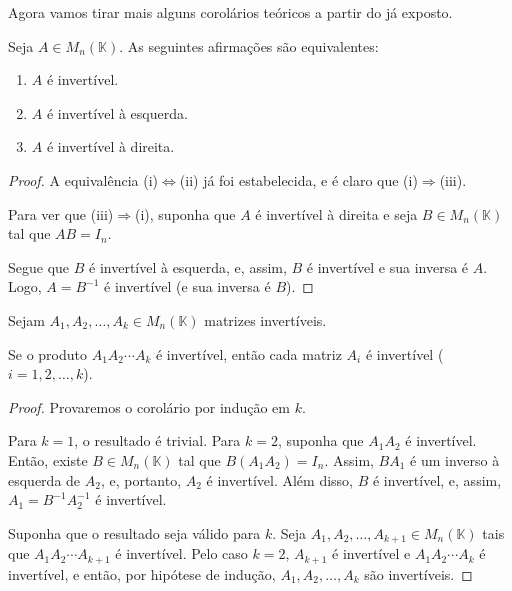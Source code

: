 Agora vamos tirar mais alguns corolários teóricos a partir do já exposto.

\begin{corollary}
    Seja $A\in M_{n}(\mathbb K)$.
    As seguintes afirmações são equivalentes:
    \begin{enumerate}[label=(\roman*)]
        \item $A$ é invertível.
        \item $A$ é invertível à esquerda.
        \item $A$ é invertível à direita.
    \end{enumerate}
\end{corollary}
\begin{proof}
    A equivalência (i)$\Leftrightarrow$(ii) já foi estabelecida, e é claro que (i)$\Rightarrow$(iii).

    Para ver que (iii)$\Rightarrow$(i), suponha que $A$ é invertível à direita e seja $B\in M_{n}(\mathbb K)$ tal que $AB=I_n$.

    Segue que $B$ é invertível à esquerda, e, assim, $B$ é invertível e sua inversa é $A$.
    Logo, $A=B^{-1}$ é invertível (e sua inversa é $B$).
\end{proof}


\begin{corollary}
    Sejam $A_1, A_2, \dots, A_k\in M_{n}(\mathbb K)$ matrizes invertíveis.

    Se o produto $A_1 A_2 \cdots A_k$ é invertível, então cada matriz $A_i$ é invertível ($i=1, 2, \dots, k$).
\end{corollary}
\begin{proof}
Provaremos o corolário por indução em $k$.

Para $k=1$, o resultado é trivial.
Para $k=2$, suponha que $A_1 A_2$ é invertível.
Então, existe $B\in M_{n}(\mathbb K)$ tal que $B(A_1 A_2) = I_n$.
Assim, $B A_1$ é um inverso à esquerda de $A_2$, e, portanto, $A_2$ é invertível.
Além disso, $B$ é invertível, e, assim, $A_1=B^{-1}A_2^{-1}$ é invertível.

Suponha que o resultado seja válido para $k$.
Seja $A_1, A_2, \dots, A_{k+1}\in M_{n}(\mathbb K)$ tais que $A_1 A_2 \cdots A_{k+1}$ é invertível.
Pelo caso $k=2$, $A_{k+1}$ é invertível e $A_1 A_2 \cdots A_k$ é invertível, e então, por hipótese de indução, $A_1, A_2, \dots, A_k$ são invertíveis.
\end{proof}

